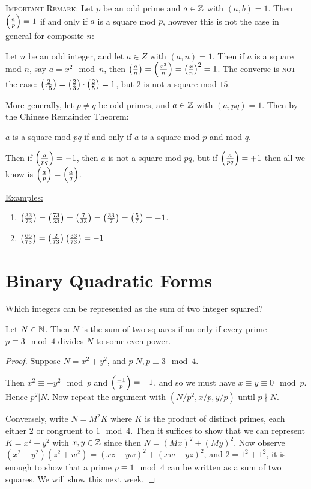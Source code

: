\documentclass[10pt,a4paper]{article}
\begin{document}
\textsc{Important Remark:} Let $p$ be an odd prime and $a \in \mathbb{Z}$ with $(a,b)=1$. Then $\left(\frac{a}{p}\right) = 1$ if and only if $a$ is a square mod $p$, however this is not the case in general for composite $n$:

Let $n$ be an odd integer, and let $a \in Z$ with $(a,n) = 1$. Then if $a$ is a square mod $n$, say $a=x^2 \mod n$, then $\left(\frac{a}{n}\right) = \left(\frac{x^2}{n}\right) = \left(\frac{x}{n}\right)^2 = 1$. The converse is \textsc{not} the case: $\left(\frac{2}{15}\right) = \left(\frac{2}{3}\right)\cdot \left(\frac{2}{5}\right) = 1$, but $2$ is not a square mod $15$.

More generally, let $p\neq q$ be odd primes, and $a \in \mathbb{Z}$ with $(a, pq)=1$. Then by the Chinese Remainder Theorem:
\begin{center}
$a$ is a square mod $pq$ if and only if $a$ is a square mod $p$ and mod $q$.
\end{center}
Then if $\left(\frac{a}{pq}\right)=-1$, then $a$ is not a square mod $pq$, but if $\left(\frac{a}{pq}\right)=+1$ then all we know is $\left(\frac{a}{p}\right) = \left(\frac{a}{q}\right)$.

\underline{Examples:}
\begin{enumerate}
\item $\left(\frac{33}{73}\right) = \left(\frac{73}{33}\right) = \left(\frac{7}{33}\right) = \left(\frac{33}{7}\right) = \left(\frac{5}{7}\right)=-1$.
\item $\left(\frac{66}{73}\right) = \left(\frac{2}{73}\right)\left(\frac{33}{73}\right) = -1$
\end{enumerate}
\section{Binary Quadratic Forms}
Which integers can be represented as the sum of two integer squared?
\begin{theorem}
Let $N \in \mathbb{N}$. Then $N$ is the sum of two squares if an only if every prime $p \equiv 3 \mod 4$ divides $N$ to some even power. 
\end{theorem}
\begin{proof}
Suppose $N=x^2+y^2$, and $p|N, p \equiv 3 \mod 4$. 

Then $x^2 \equiv -y^2 \mod p$ and $\left(\frac{-1}{p}\right)=-1$, and so we must have $x \equiv y \equiv 0 \mod p$. Hence $p^2 | N$. Now repeat the argument with $(N/p^2, x/p, y/p)$ until $p\nmid N$.

Conversely, write $N=M^2 K$ where $K$ is the product of distinct primes, each either $2$ or congruent to $1 \mod 4$. Then it suffices to show that we can represent $K=x^2+y^2$ with $x,y \in \mathbb{Z}$ since then $N = (Mx)^2 +(My)^2$. Now observe $(x^2+y^2)(z^2+w^2) = (xz-yw)^2 + (xw+yz)^2$, and $2=1^2+1^2$, it is enough to show that a prime $p \equiv 1 \mod 4$ can be written as a sum of two squares. We will show this next week.
\end{proof}
\end{document}
